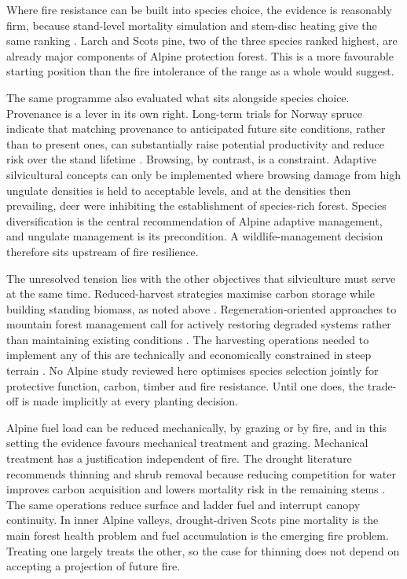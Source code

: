 \documentclass[11pt,a4paper]{article}
\begin{document}
Where fire resistance can be built into species choice, the evidence is reasonably firm, because stand-level mortality simulation and stem-disc heating give the same ranking \citep{dupire_vulnerability_2019, mutterer_bark_2026}. Larch and Scots pine, two of the three species ranked highest, are already major components of Alpine protection forest. This is a more favourable starting position than the fire intolerance of the range as a whole would suggest.

The same programme also evaluated what sits alongside species choice. Provenance is a lever in its own right. Long-term trials for Norway spruce indicate that matching provenance to anticipated future site conditions, rather than to present ones, can substantially raise potential productivity and reduce risk over the stand lifetime \citep{jandl_management_2013}. Browsing, by contrast, is a constraint. Adaptive silvicultural concepts can only be implemented where browsing damage from high ungulate densities is held to acceptable levels, and at the densities then prevailing, deer were inhibiting the establishment of species-rich forest. Species diversification is the central recommendation of Alpine adaptive management, and ungulate management is its precondition. A wildlife-management decision therefore sits upstream of fire resilience.

The unresolved tension lies with the other objectives that silviculture must serve at the same time. Reduced-harvest strategies maximise carbon storage while building standing biomass, as noted above \citep{jandl_strategies_2018}. Regeneration-oriented approaches to mountain forest management call for actively restoring degraded systems rather than maintaining existing conditions \citep{majlingova_sustainability_2025}. The harvesting operations needed to implement any of this are technically and economically constrained in steep terrain \citep{dinca_timber_2025}. No Alpine study reviewed here optimises species selection jointly for protective function, carbon, timber and fire resistance. Until one does, the trade-off is made implicitly at every planting decision.

Alpine fuel load can be reduced mechanically, by grazing or by fire, and in this setting the evidence favours mechanical treatment and grazing. Mechanical treatment has a justification independent of fire. The drought literature recommends thinning and shrub removal because reducing competition for water improves carbon acquisition and lowers mortality risk in the remaining stems \citep{giuggiola_droughtinduced_2010}. The same operations reduce surface and ladder fuel and interrupt canopy continuity. In inner Alpine valleys, drought-driven Scots pine mortality is the main forest health problem and fuel accumulation is the emerging fire problem. Treating one largely treats the other, so the case for thinning does not depend on accepting a projection of future fire.
\end{document}
